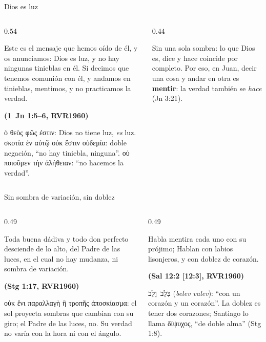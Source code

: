 \documentclass[hyperref={bookmarks=false},aspectratio=169]{beamer}
\newcommand{\heb}[1]{\mbox{\foreignlanguage{hebrew}{#1}}}
\newcommand{\grc}[1]{\foreignlanguage{ancientgreek}{#1}}
\newcommand{\fuente}[1]{\par\hfill{\upshape\bfseries\footnotesize\textcolor{azul}{#1}}}
\newcommand{\destacar}[1]{\textbf{\textcolor{azul}{#1}}}
\begin{document}
\begin{frame}{Dios es luz}
\begin{columns}[t,onlytextwidth]
\begin{column}{0.54\textwidth}
\begin{cita}Este es el mensaje que hemos oído de él, y os anunciamos: Dios es luz, y no hay ningunas tinieblas en él. Si decimos que tenemos comunión con él, y andamos en tinieblas, mentimos, y no practicamos la verdad.\fuente{(1~Jn 1:5--6, RVR1960)}\end{cita}
\scriptsize\grc{ὁ θεὸς φῶς ἐστιν}: Dios no tiene luz, \emph{es} luz. \grc{σκοτία ἐν αὐτῷ οὐκ ἔστιν οὐδεμία}: doble negación, ``no hay tiniebla, ninguna''. \grc{οὐ ποιοῦμεν τὴν ἀλήθειαν}: ``no hacemos la verdad''.
\end{column}
\begin{column}{0.44\textwidth}
\centering
{}\par\smallskip
\small Sin una sola sombra: lo que Dios es, dice y hace coincide por completo. Por eso, en Juan, decir una cosa y andar en otra es \destacar{mentir}: la verdad también se \emph{hace} (Jn 3:21).
\end{column}
\end{columns}
\end{frame}

\begin{frame}{Sin sombra de variación, sin doblez}
\begin{columns}[t,onlytextwidth]
\begin{column}{0.49\textwidth}
\begin{cita}Toda buena dádiva y todo don perfecto desciende de lo alto, del Padre de las luces, en el cual no hay mudanza, ni sombra de variación.\fuente{(Stg 1:17, RVR1960)}\end{cita}
\scriptsize\grc{οὐκ ἔνι παραλλαγὴ ἢ τροπῆς ἀποσκίασμα}: el sol proyecta sombras que cambian con su giro; el Padre de las luces, no. Su verdad no varía con la hora ni con el ángulo.
\end{column}
\begin{column}{0.49\textwidth}
\begin{cita}Habla mentira cada uno con su prójimo; Hablan con labios lisonjeros, y con doblez de corazón.\fuente{(Sal 12:2 [12:3], RVR1960)}\end{cita}
\scriptsize\heb{בְּלֵב וָלֵב} (\emph{belev valev}): ``con un corazón y un corazón''. La doblez es tener dos corazones; Santiago lo llama \grc{δίψυχος}, ``de doble alma'' (Stg 1:8).
\end{column}
\end{columns}
\end{frame}
\end{document}
